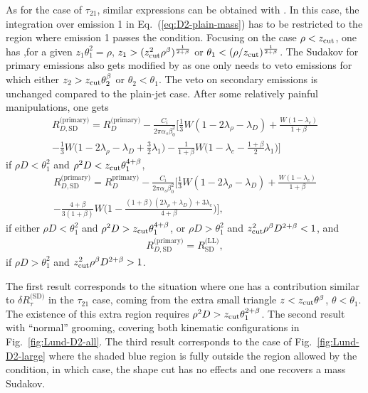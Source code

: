 As for the case of $\tau_{21}$, similar expressions can be obtained
with \SD. In this case, the integration over emission 1 in
Eq.~(\ref{eq:D2-plain-mass}) has to be restricted to the region where
emission 1 passes the \SD condition. Focusing on the case
$\rho<z_{\text{cut}}$, one has ,for a given $z_1\theta_1^2=\rho$,
$z_1>(z_{\text{cut}}^2\rho^\beta)^{\frac{1}{2+\beta}}$ or
$\theta_1<(\rho/z_{\text{cut}})^{\frac{1}{2+\beta}}$.
%
The Sudakov for primary emissions also gets modified by \SD as one
only needs to veto emissions for which either
$z_2>z_{\text{cut}}\theta_2^\beta$ or $\theta_2<\theta_1$. The veto on
secondary emissions is unchanged compared to the plain-jet case.
%
After some relatively painful manipulations, one gets
\begin{align}
  R_{D,\text{SD}}^\text{(primary)} = R_D^\text{(primary)}
  - \frac{C_i}{2\pi\alpha_s\beta_0^2}
  \bigg[\frac{1}{3}W(1-2\lambda_\rho-\lambda_D)
  +\frac{W(1-\lambda_c)}{1+\beta}\nonumber\\
  -\frac{1}{3}W\Big(1-2\lambda_\rho-\lambda_D+\frac{3}{2}\lambda_1\Big)
  -\frac{1}{1+\beta}W\Big(1-\lambda_c-\frac{1+\beta}{2}\lambda_1\Big)
  \bigg]  
\end{align}
if $\rho D<\theta_1^2$ and  $\rho^2 D< z_{\text{cut}} \theta_1^{4+\beta}$,
\begin{align}
  R_{D,\text{SD}}^\text{(primary)} = R_D^\text{primary)}
  - \frac{C_i}{2\pi\alpha_s\beta_0^2}
  \bigg[\frac{1}{3}W(1-2\lambda_\rho-\lambda_D)
  +\frac{W(1-\lambda_c)}{1+\beta}\nonumber \\
  -\frac{4+\beta}{3(1+\beta)}W\Big(1-\frac{(1+\beta)(2\lambda_\rho+\lambda_D)+3\lambda_c}{4+\beta}\Big)
  \bigg],
\end{align}
if either $\rho D<\theta_1^2$ and $\rho^2 D> z_{\text{cut}}
\theta_1^{4+\beta}$, or  $\rho D>\theta_1^2$ and $z_{\text{cut}}^2 \rho^\beta
D^{2+\beta}<1$, and
%
%
%
\begin{align}
  R_{D,\text{SD}}^\text{(primary)} = R_{\text{SD}}^{\text{(LL)}},
\end{align}
if $\rho D>\theta_1^2$ and $z_{\text{cut}}^2 \rho^\beta D^{2+\beta}>1$.

The first result corresponds to the situation where one has a
contribution similar to $\delta R_{\tau}^\text{(SD)}$ in the
$\tau_{21}$ case, coming from the extra small triangle
$z<z_{\text{cut}}\theta^\beta$, $\theta<\theta_1$. The existence of this
extra region requires $\rho^2 D> z_{\text{cut}} \theta_1^{2+\beta}$.
%
The second result with ``normal'' \SD grooming, covering both
kinematic configurations in Fig.~\ref{fig:Lund-D2-all}.
%
The third result corresponds to the case of
Fig.~\ref{fig:Lund-D2-large} where the shaded blue region is fully
outside the region allowed by the \SD condition, in which case, the
shape cut has no effects and one recovers a \SD mass Sudakov.


